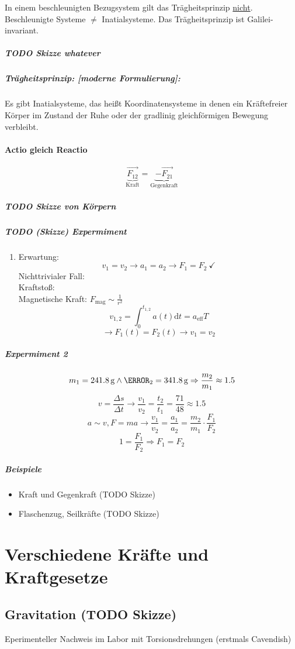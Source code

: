 \documentclass[a4paper]{scrartcl}
\renewcommand{\d}{\mathrm{d}}
\newcommand{\f}[2]{{\frac{#1}{#2}}}
\renewcommand{\v}[1]{\vec{#1}}
\begin{document}
In einem beschleunigten Bezugsystem gilt das Trägheitsprinzip \uline{nicht}. Beschleunigte Systeme $\neq$ Inatialsysteme.
Das Trägheitsprinzip ist Galilei-invariant.

\subparagraph{{\bfseries\sffamily TODO} Skizze whatever}
\label{sec-7-2-1-5-1}
\subparagraph{Trägheitsprinzip: [moderne Formulierung]:}
\label{sec-7-2-1-5-2}
Es gibt Inatialsysteme, das heißt Koordinatensysteme  in denen ein Kräftefreier Körper im Zustand der Ruhe oder der gradlinig gleichförmigen Bewegung verbleibt.

\paragraph{Actio gleich Reactio}
\label{sec-7-2-1-6}
\[\underbrace{\v{F_{12}}}_{\text{Kraft}} = \underbrace{-\v{F_{21}}}_{\text{Gegenkraft}}\]
\subparagraph{{\bfseries\sffamily TODO} Skizze von Körpern}
\label{sec-7-2-1-6-1}
\subparagraph{{\bfseries\sffamily TODO} (Skizze) Expermiment}
\label{sec-7-2-1-6-2}
\begin{enumerate}
\item Erwartung:
\label{sec-7-2-1-6-2-1}
\[v_1 = v_2 \rightarrow a_1 = a_2 \rightarrow F_1 = F_2~\checkmark\]
Nichttrivialer Fall: \\
       Kraftstoß: \\
       Magnetische Kraft: $F_{\text{mag}} \sim {\f{1}{r^2}}$
\[v_{1,2} = \int_0^{t_{1,2}} a(t)\d t = a_{\text{eff}}T\]
\[\rightarrow F_1(t) = F_2(t) \rightarrow v_1 = v_2\]
\end{enumerate}
\subparagraph{Expermiment 2}
\label{sec-7-2-1-6-3}
\[m_1 = \SI{241.8}{\gram} \wedge \m_2 = \SI{341.8}{\gram} \Rightarrow \f{m_2}{m_1} \approx 1.5\]
\[v = \f{\Delta s}{\Delta t} \rightarrow \f{v_1}{v_2} = \f{t_2}{t_1} = \f{71}{48} \approx 1.5\]
\[a\sim v, F = m a \rightarrow \f{v_1}{v_2} = \f{a_1}{a_2} = \f{m_2}{m_1}\cdot \f{F_1}{F_2}\]
\[1 = \f{F_1}{F_2} \Rightarrow F_1 = F_2\]
\subparagraph{Beispiele}
\label{sec-7-2-1-6-4}
\begin{itemize}
\item Kraft und Gegenkraft (TODO Skizze)
\item Flaschenzug, Seilkräfte (TODO Skizze)
\end{itemize}
\section{Verschiedene Kräfte und Kraftgesetze}
\label{sec-8}
\subsection{Gravitation (TODO Skizze)}
\label{sec-8-1}
Eperimenteller Nachweis im Labor mit Torsionsdrehungen (erstmals Cavendish)
\end{document}
